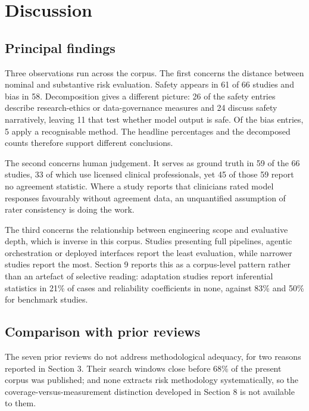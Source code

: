 \documentclass[11pt]{article}
\begin{document}
	
	\section{Discussion}
	
	\subsection{Principal findings}
	
	Three observations run across the corpus. The first concerns the distance between nominal and
	substantive risk evaluation. Safety appears in 61 of 66 studies and bias in 58. Decomposition gives a different
	picture: 26 of the safety entries describe research-ethics or data-governance measures and 24
	discuss safety narratively, leaving 11 that test whether model output is safe. Of the bias entries,
	5 apply a recognisable method. The headline percentages and the decomposed counts therefore support
	different conclusions.
	
	The second concerns human judgement. It serves as ground truth in 59 of the 66 studies, 33
	of which use licensed clinical professionals, yet 45 of those 59 report no agreement
	statistic. Where a study reports that clinicians rated model responses favourably without agreement
	data, an unquantified assumption of rater consistency is doing the work.
	
	The third concerns the relationship between engineering scope and evaluative depth, which is
	inverse in this corpus. Studies presenting full pipelines, agentic orchestration or deployed
	interfaces report the least evaluation, while narrower studies report the most. Section 9 reports
	this as a corpus-level pattern rather than an artefact of selective reading: adaptation studies
	report inferential statistics in 21\% of cases and reliability coefficients in none, against 83\%
	and 50\% for benchmark studies.
	
	\subsection{Comparison with prior reviews}
	
	The seven prior reviews do not address methodological adequacy, for two reasons reported in
	Section 3. Their search windows close before 68\% of the present corpus was published; and none
	extracts risk methodology systematically, so the coverage-versus-measurement distinction developed
	in Section 8 is not available to them.
	
\end{document}
